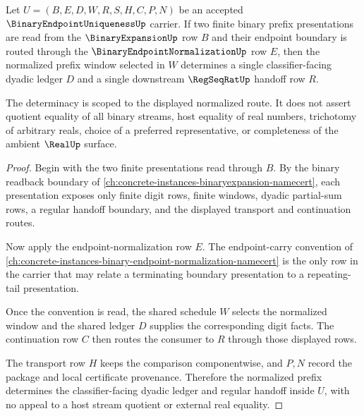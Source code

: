 \begin{theorem}
\label{thm:binary-endpoint-uniqueness-normalized-prefix-determinacy}
Let $U=(B,E,D,W,R,S,H,C,P,N)$ be an accepted $\BinaryEndpointUniquenessUp$ carrier. If two finite binary prefix presentations are read from the $\BinaryExpansionUp$ row $B$ and their endpoint boundary is routed through the $\BinaryEndpointNormalizationUp$ row $E$, then the normalized prefix window selected in $W$ determines a single classifier-facing dyadic ledger $D$ and a single downstream $\RegSeqRatUp$ handoff row $R$.

The determinacy is scoped to the displayed normalized route. It does not assert quotient equality of all binary streams, host equality of real numbers, trichotomy of arbitrary reals, choice of a preferred representative, or completeness of the ambient $\RealUp$ surface.
\end{theorem}
\begin{proof}
Begin with the two finite presentations read through $B$. By the binary readback boundary of \autoref{ch:concrete-instances-binaryexpansion-namecert}, each presentation exposes only finite digit rows, finite windows, dyadic partial-sum rows, a regular handoff boundary, and the displayed transport and continuation routes.

Now apply the endpoint-normalization row $E$. The endpoint-carry convention of \autoref{ch:concrete-instances-binary-endpoint-normalization-namecert} is the only row in the carrier that may relate a terminating boundary presentation to a repeating-tail presentation.

Once the convention is read, the shared schedule $W$ selects the normalized window and the shared ledger $D$ supplies the corresponding digit facts. The continuation row $C$ then routes the consumer to $R$ through those displayed rows.

The transport row $H$ keeps the comparison componentwise, and $P,N$ record the package and local certificate provenance. Therefore the normalized prefix determines the classifier-facing dyadic ledger and regular handoff inside $U$, with no appeal to a host stream quotient or external real equality.
\end{proof}

